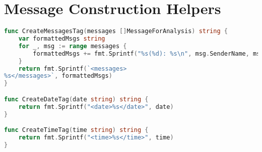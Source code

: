 \section{Message Construction Helpers}

\begin{lstlisting}[language=Go]
func CreateMessagesTag(messages []MessageForAnalysis) string {
	var formattedMsgs string
	for _, msg := range messages {
		formattedMsgs += fmt.Sprintf("%s(%d): %s\n", msg.SenderName, msg.Timestamp, msg.Body)
	}
	return fmt.Sprintf(`<messages>
%s</messages>`, formattedMsgs)
}

func CreateDateTag(date string) string {
	return fmt.Sprintf("<date>%s</date>", date)
}

func CreateTimeTag(time string) string {
	return fmt.Sprintf("<time>%s</time>", time)
}
\end{lstlisting}

